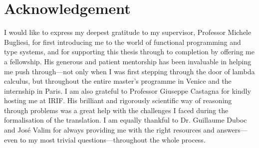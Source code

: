 \section*{Acknowledgement}
I would like to express my deepest gratitude to my supervisor, Professor Michele Bugliesi, for first introducing me to the world of functional programming and type systems, and for supporting this thesis through to completion by offering me a fellowship. 
His generous and patient mentorship has been invaluable in helping me push through---not only when I was first stepping through the door of lambda calculus, but throughout the entire master's programme in Venice and the internship in Paris. 
I am also grateful to Professor Giuseppe Castagna for kindly hosting me at IRIF. 
His brilliant and rigorously scientific way of reasoning through problems was a great help with the challenges I faced during the formalisation of the translation. 
I am equally thankful to Dr. Guillaume Duboc and José Valim for always providing me with the right resources and answers---even to my most trivial questions---throughout the whole process.